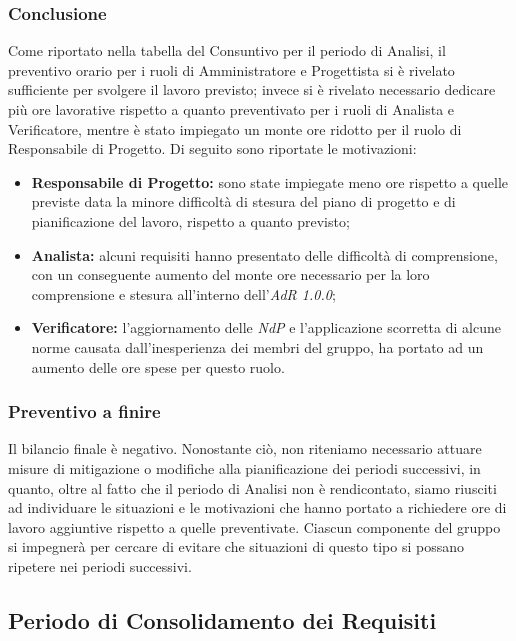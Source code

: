 \subsubsection{Conclusione}
Come riportato nella tabella del Consuntivo per il periodo di Analisi, il preventivo orario per i ruoli di Amministratore e Progettista si è rivelato sufficiente per svolgere il lavoro previsto; invece si è rivelato necessario dedicare più ore lavorative rispetto a quanto preventivato per i ruoli di Analista e Verificatore, mentre è stato impiegato un monte ore ridotto per il ruolo di Responsabile di Progetto. Di seguito sono riportate le motivazioni:
\begin{itemize}
	\item \textbf{Responsabile di Progetto:} sono state impiegate meno ore rispetto a quelle previste data la minore difficoltà di stesura del piano di progetto e di pianificazione del lavoro, rispetto a quanto previsto;
	\item \textbf{Analista:} alcuni requisiti hanno presentato delle difficoltà di comprensione, con un conseguente aumento del monte ore necessario per la loro comprensione e stesura all'interno dell'\textit{AdR{} 1.0.0};
	\item \textbf{Verificatore:} l'aggiornamento delle \textit{NdP{}} e l'applicazione scorretta di alcune norme causata dall'inesperienza dei membri del gruppo, ha portato ad un aumento delle ore spese per questo ruolo.
\end{itemize}

\subsubsection{Preventivo a finire}
Il bilancio finale è negativo. Nonostante ciò, non riteniamo necessario attuare misure di mitigazione o modifiche alla pianificazione dei periodi successivi, in quanto, oltre al fatto che il periodo di Analisi non è rendicontato, siamo riusciti ad individuare le situazioni e le motivazioni che hanno portato a richiedere ore di lavoro aggiuntive rispetto a quelle preventivate. Ciascun componente del gruppo si impegnerà per cercare di evitare che situazioni di questo tipo si possano ripetere nei periodi successivi.

\subsection{Periodo di Consolidamento dei Requisiti}
